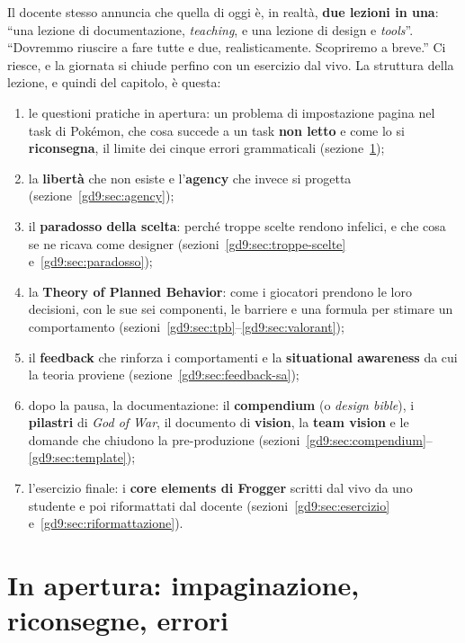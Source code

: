 Il docente stesso annuncia che quella di oggi è, in realtà, \textbf{due
lezioni in una}: ``una lezione di documentazione, \emph{teaching}, e una
lezione di design e \emph{tools}''. ``Dovremmo riuscire a fare tutte e due,
realisticamente. Scopriremo a breve.'' Ci riesce, e la giornata si chiude
perfino con un esercizio dal vivo. La struttura della lezione, e quindi del
capitolo, è questa:
\begin{enumerate}
  \item le questioni pratiche in apertura: un problema di impostazione
        pagina nel task di Pokémon, che cosa succede a un task \textbf{non
        letto} e come lo si \textbf{riconsegna}, il limite dei cinque errori
        grammaticali (sezione~\ref{gd9:sec:apertura});
  \item la \textbf{libertà} che non esiste e l'\textbf{agency} che invece si
        progetta (sezione~\ref{gd9:sec:agency});
  \item il \textbf{paradosso della scelta}: perché troppe scelte rendono
        infelici, e che cosa se ne ricava come designer
        (sezioni~\ref{gd9:sec:troppe-scelte}
        e~\ref{gd9:sec:paradosso});
  \item la \textbf{Theory of Planned Behavior}: come i giocatori prendono
        le loro decisioni, con le sue sei componenti, le barriere e una
        formula per stimare un comportamento
        (sezioni~\ref{gd9:sec:tpb}--\ref{gd9:sec:valorant});
  \item il \textbf{feedback} che rinforza i comportamenti e la
        \textbf{situational awareness} da cui la teoria proviene
        (sezione~\ref{gd9:sec:feedback-sa});
  \item dopo la pausa, la documentazione: il \textbf{compendium} (o
        \emph{design bible}), i \textbf{pilastri} di \emph{God of War}, il
        documento di \textbf{vision}, la \textbf{team vision} e le domande
        che chiudono la pre-produzione
        (sezioni~\ref{gd9:sec:compendium}--\ref{gd9:sec:template});
  \item l'esercizio finale: i \textbf{core elements di Frogger} scritti dal
        vivo da uno studente e poi riformattati dal docente
        (sezioni~\ref{gd9:sec:esercizio} e~\ref{gd9:sec:riformattazione}).
\end{enumerate}

\section{In apertura: impaginazione, riconsegne, errori}
\label{gd9:sec:apertura}

